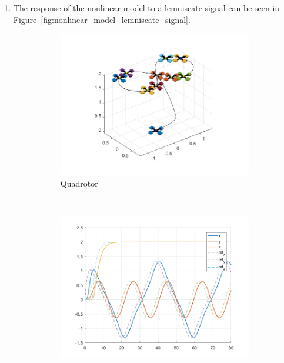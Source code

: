 \documentclass[11pt]{article}
\begin{document}
\begin{enumerate}
    \item The response of the nonlinear model to a lemniscate signal can be
    seen in Figure~\ref{fig:nonlinear_model_lemniscate_signal}.
    \begin{figure}[ht]
        \centering
        \begin{subfigure}[c]{0.3\linewidth}
            \centering
            \includegraphics[width=\linewidth]{Plots_13_NonlinearModel_Lemniscate/01}
            \caption{Quadrotor}
        \end{subfigure}
        ~
        \begin{subfigure}[c]{0.3\linewidth}
            \centering
            \includegraphics[width=\linewidth]{Plots_13_NonlinearModel_Lemniscate/02}

\end{subfigure}
\end{figure}
\end{enumerate}
\end{document}
